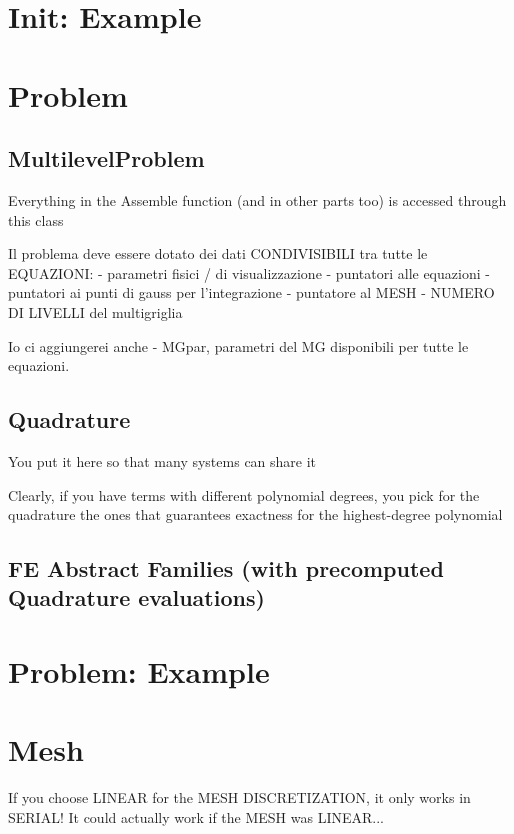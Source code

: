 \documentclass[10pt]{book}
\begin{document}
  \chapter{Init: Example}

  
  \chapter{Problem}

  
    \section{MultilevelProblem}

  Everything in the Assemble function (and in other parts too) is accessed through this class
  
Il problema deve essere dotato dei dati CONDIVISIBILI tra tutte le EQUAZIONI:
   - parametri fisici / di visualizzazione
   - puntatori alle equazioni
   - puntatori ai punti di gauss per l'integrazione
   - puntatore al MESH
   - NUMERO DI LIVELLI del multigriglia

Io ci aggiungerei anche 
   - MGpar, parametri del MG disponibili per tutte le equazioni.
   
\section{ Quadrature }

You put it here so that many systems can share it

Clearly, if you have terms with different polynomial degrees,
you pick for the quadrature the ones that guarantees exactness for the highest-degree polynomial
  
\section{FE Abstract Families (with precomputed Quadrature evaluations)}
  
  
 \chapter{Problem: Example}
  
 
 \chapter{ Mesh}

    
 If you choose LINEAR for the MESH DISCRETIZATION, it only works in SERIAL! It could actually work if the MESH was LINEAR...
 
\end{document}
